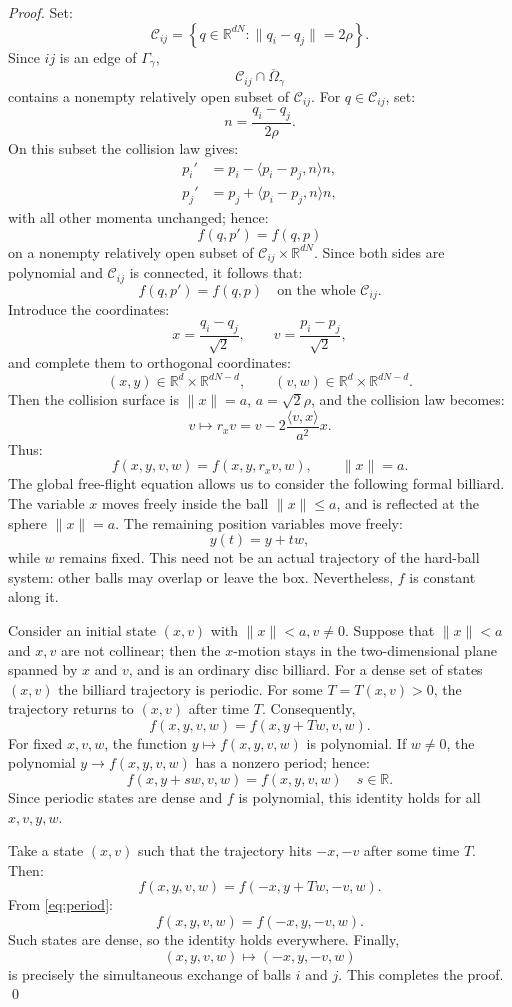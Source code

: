 \documentclass[10pt,a4paper]{amsart}
\def \R {\mathbb{R}}
\begin{document}
\begin{proof}
Set:
\[
\mathcal C_{ij}
=
\left\{
q\in\R^{dN}:\|q_i-q_j\|=2\rho
\right\}.
\]
Since \(ij\) is an edge of \(\Gamma_\gamma\),
\[
\mathcal C_{ij}\cap\overline{\Omega}_\gamma
\]
contains a nonempty relatively open subset of \(\mathcal C_{ij}\). For \(q\in\mathcal C_{ij}\), set:
\[
n=\frac{q_i-q_j}{2\rho}.
\]
On this subset the collision law gives:
\[
\begin{aligned}
p_i'&=p_i-\langle p_i-p_j,n\rangle n,\\
p_j'&=p_j+\langle p_i-p_j,n\rangle n,
\end{aligned}
\]
with all other momenta unchanged; hence:
\[
f(q,p')=f(q,p)
\]
on a nonempty relatively open subset of
\(\mathcal C_{ij}\times\R^{dN}\). Since both sides are polynomial and
\(\mathcal C_{ij}\) is connected, it 
follows that:
\[
f(q,p')=f(q,p)\quad \text{on the whole $\mathcal C_{ij}$.}
\]
Introduce the coordinates:
\[
x=\frac{q_i-q_j}{\sqrt2},
\qquad
v=\frac{p_i-p_j}{\sqrt2},
\]
and complete them to orthogonal 
coordinates:
\[
(x,y)\in\R^d\times\R^{dN-d},
\qquad
(v,w)\in\R^d\times\R^{dN-d}.
\]
Then the collision surface is \(\|x\|=a\), \(a = \sqrt{2} \rho\), and the collision law becomes:
\[
v\longmapsto
r_xv
=
v-2\frac{\langle v,x\rangle}{a^2}x.
\]
Thus:
\begin{equation}\label{eq:ball-reflection}
f(x,y,v,w)=f(x,y,r_xv,w),
\qquad \|x\|=a.
\end{equation}
The global free-flight equation 
allows us to consider the 
following formal billiard. The variable \(x\) moves freely inside the 
ball \(\|x\| \le a\), 
and is reflected at the sphere 
\(\|x\|=a\). The remaining position 
variables move freely:
\[
y(t)=y+tw,
\]
while \(w\) remains fixed. This need not be an actual trajectory of the
hard-ball system: other balls may overlap or leave the box. Nevertheless, \(f\) is constant along it. 
\smallskip%

Consider an initial state \((x,v)\) 
with \(\|x\|< a, v\neq 0\). Suppose that \(\|x\|<a\) and \(x,v\) are not 
collinear; then the \(x\)-motion stays in the two-dimensional plane spanned by \(x\) and
\(v\), and is an ordinary 
disc billiard. For a dense set of states \((x,v)\) the billiard trajectory 
is periodic. For some 
\(T = T(x,v) > 0\),
the trajectory returns to \((x,v)\) 
after time \(T\). Consequently,
\[
 f(x,y,v,w)
=
f(x,y+Tw,v,w).
\]
For fixed \(x,v,w\), the function \(y\mapsto f(x,y,v,w)\) is polynomial. If \(w\ne0\), the polynomial \(y\to f(x,y,v,w)\) has a nonzero
period; hence:
\begin{equation}\label{eq:period}
f(x,y+sw,v,w)=f(x,y,v,w) \quad s\in\R.
\end{equation}
Since periodic states are dense and \(f\) is polynomial, this identity
holds for all \(x,v,y,w\).
\smallskip%

Take a state \((x,v)\) such that the 
trajectory hits \(-x, -v\) after 
some time \(T\). Then:
\[
f(x,y,v,w) = f(-x,y + T w,-v,w).
\]
From \eqref{eq:period}: 
\[
f(x,y,v,w) = f(-x,y,-v,w).
\]
Such states are dense, so the identity holds everywhere. Finally,
\[
(x,y,v,w)\longmapsto(-x,y,-v,w)
\]
is precisely the simultaneous exchange of balls \(i\) and \(j\). This completes the proof. \qed
\end{proof}
\end{document}
